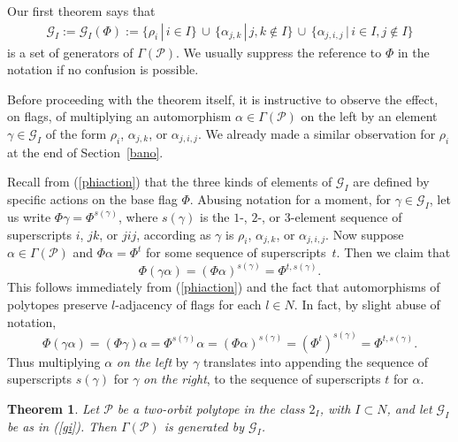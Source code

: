 \documentclass[12pt]{article}
\renewcommand{\>}{\rangle}
\newtheorem{theorem}{Theorem}[section]
\theoremstyle{definition}\newtheorem{definition}{Definition}[section]
\begin{document}
Our first theorem says that  
\begin{eqnarray}
\label{gi}
\mathcal{G}_{I} :=\mathcal{G}_{I}(\Phi):= 
\{ \rho_i \,|\, i \in I\} \,\cup\, \{\alpha_{j,k}\,|\, j,k \notin I   \} \,\cup\, \{ \alpha_{j,i,j} \,|\, i \in I, j \notin I \}
\end{eqnarray}
is a set of generators of $\Gamma(\mathcal{P})$. We usually suppress the reference to $\Phi$ in the notation if no confusion is possible.
\smallskip

Before proceeding with the theorem itself, it is instructive to observe the effect, on flags, of multiplying an automorphism $\alpha\in\Gamma(\mathcal{P})$ on the left by an element $\gamma\in\mathcal{G}_{I}$ of the form $\rho_i$, $\alpha_{j,k}$, or $\alpha_{j,i,j}$. We already made a similar observation for $\rho_i$ at the end of Section~\ref{bano}.

Recall from (\ref{phiaction}) that the three kinds of elements of $\mathcal{G}_{I}$ are defined by specific actions on the base flag $\Phi$. Abusing notation for a moment, for $\gamma\in\mathcal{G}_{I}$, let us write $\Phi\gamma=\Phi^{s(\gamma)}$, where $s(\gamma)$ is the $1$-, $2$-, or $3$-element sequence of superscripts $i$, $jk$, or $jij$, according as $\gamma$ is $\rho_i$, $\alpha_{j,k}$, or $\alpha_{j,i,j}$. Now suppose $\alpha\in\Gamma(\mathcal{P})$ and $\Phi\alpha=\Phi^t$ for some sequence of superscripts~$t$. Then we claim that 
\begin{equation}
\label{append}
\Phi (\gamma\alpha) = (\Phi\alpha)^{s(\gamma)} = \Phi^{t,s(\gamma)}.
\end{equation}
This follows immediately from (\ref{phiaction}) and the fact that automorphisms of polytopes preserve $l$-adjacency of flags for each $l\in N$. In fact, by slight abuse of notation, 
\[ \Phi (\gamma\alpha) = (\Phi\gamma)\alpha = \Phi^{s(\gamma)}\alpha
=(\Phi\alpha)^{s(\gamma)} = (\Phi^{t})^{s(\gamma)} = \Phi^{t,s(\gamma)}.\]
Thus multiplying $\alpha$ {\it on the left} by $\gamma$ translates into appending the sequence of superscripts $s(\gamma)$ for $\gamma$ {\it on the right\/}, to the sequence of superscripts $t$ for $\alpha$.
\smallskip

\begin{theorem}
\label{generators}
Let $\mathcal{P}$ be a two-orbit polytope in the class $2_I$, with $I\subset N$, and let $\mathcal{G}_{I}$ be as in (\ref{gi}). Then $\Gamma(\mathcal{P})$ is generated by $\mathcal{G}_{I}$.
\end{theorem}
\end{document}
